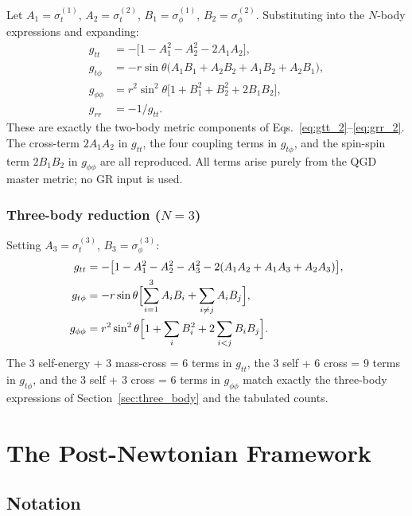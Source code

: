 \documentclass[11pt,a4paper]{article}
\theoremstyle{plain}
\theoremstyle{definition}
\theoremstyle{remark}
\newcommand{\sig}[2]{\sigma_{#1}^{(#2)}}
\begin{document}
Let $A_1 = \sig{t}{1}$, $A_2 = \sig{t}{2}$, $B_1 = \sig{\phi}{1}$, $B_2 = \sig{\phi}{2}$.  Substituting into the $N$-body expressions and expanding:
\begin{align}
  g_{tt} &= -\bigl[1 - A_1^2 - A_2^2 - 2A_1A_2\bigr], \\
  g_{t\phi} &= -r\sin\theta\bigl(A_1B_1 + A_2B_2 + A_1B_2 + A_2B_1\bigr), \\
  g_{\phi\phi} &= r^2\sin^2\theta\bigl[1 + B_1^2 + B_2^2 + 2B_1B_2\bigr],\\
  g_{rr} &= -1/g_{tt}.
\end{align}
These are exactly the two-body metric components of Eqs.~\eqref{eq:gtt_2}--\eqref{eq:grr_2}.  The cross-term $2A_1A_2$ in $g_{tt}$, the four coupling terms in $g_{t\phi}$, and the spin-spin term $2B_1B_2$ in $g_{\phi\phi}$ are all reproduced.  All terms arise purely from the QGD master metric; no GR input is used.

\subsubsection*{Three-body reduction ($N=3$)}

Setting $A_3 = \sig{t}{3}$, $B_3 = \sig{\phi}{3}$:
\begin{align}
  g_{tt} &= -\bigl[1 - A_1^2 - A_2^2 - A_3^2 - 2(A_1A_2 + A_1A_3 + A_2A_3)\bigr], \\
  g_{t\phi} &= -r\sin\theta\Bigl[\sum_{i=1}^3 A_iB_i + \sum_{i\neq j}A_iB_j\Bigr], \\
  g_{\phi\phi} &= r^2\sin^2\theta\Bigl[1 + \sum_i B_i^2 + 2\sum_{i<j}B_iB_j\Bigr].
\end{align}
The 3 self-energy + 3 mass-cross = 6 terms in $g_{tt}$, the 3 self + 6 cross = 9 terms in $g_{t\phi}$, and the 3 self + 3 cross = 6 terms in $g_{\phi\phi}$ match exactly the three-body expressions of Section~\ref{sec:three_body} and the tabulated counts.

\section{The Post-Newtonian Framework}
\label{sec:pn_framework}

\subsection{Notation}
\end{document}
